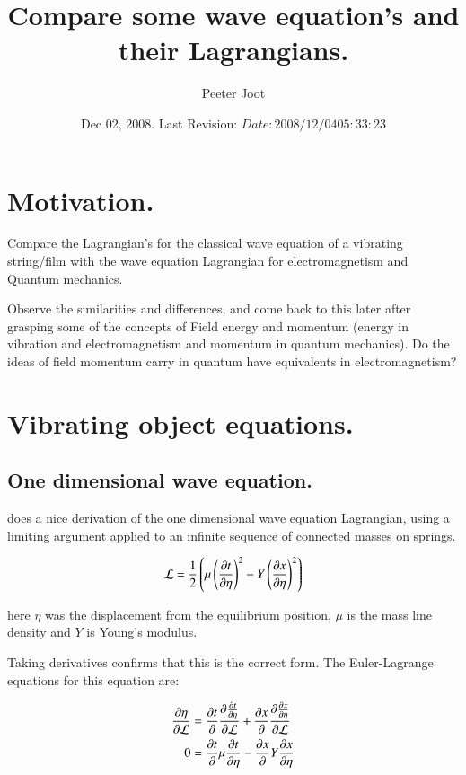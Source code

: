 \documentclass{article}
\title{ Compare some wave equation's and their Lagrangians. }
\author{Peeter Joot}
\date{ Dec 02, 2008.  Last Revision: $Date: 2008/12/04 05:33:23 $ }
\begin{document}
\maketitle{}

\tableofcontents

\section{ Motivation. }

Compare the Lagrangian's for the classical wave equation of a vibrating string/film with the wave equation Lagrangian for electromagnetism and Quantum mechanics.

Observe the similarities and differences, and come back to this later after grasping some of the concepts of Field energy and momentum (energy in vibration and electromagnetism and momentum in quantum mechanics).  Do the ideas of field momentum carry in quantum have equivalents in electromagnetism?

\section{ Vibrating object equations. }

\subsection{ One dimensional wave equation. }

\cite{goldstein1951cm} does a nice derivation of the one dimensional wave
equation Lagrangian, using a limiting argument applied to an infinite
sequence of connected masses on springs.

\begin{align}\label{eqn:oneDimensionalWaveLagrangian}
\mathcal{L} = \frac{1}{2} \left(\mu \left(\frac{\partial{t}}{\partial {\eta}}\right)^2 - Y \left(\frac{\partial{x}}{\partial {\eta}}\right)^2 \right)
\end{align}

here $\eta$ was the displacement from the equilibrium position, $\mu$ is the mass line density and $Y$ is Young's modulus.

Taking derivatives confirms that this is the correct form.  The Euler-Lagrange
equations for this equation are:

\begin{align*}
\frac{\partial{\eta}}{\partial {\mathcal{L}}} &= \frac{\partial{t}}{\partial {}} \frac{\partial{ \frac{\partial{t}}{\partial {\eta}} }}{\partial {\mathcal{L}}} +\frac{\partial{x}}{\partial {}} \frac{\partial{ \frac{\partial{x}}{\partial {\eta}} }}{\partial {\mathcal{L}}} \\
0 &= \frac{\partial{t}}{\partial {}} \mu \frac{\partial{t}}{\partial {\eta}} -\frac{\partial{x}}{\partial {}} Y \frac{\partial{x}}{\partial {\eta}} \\
\end{align*}
\end{document}
